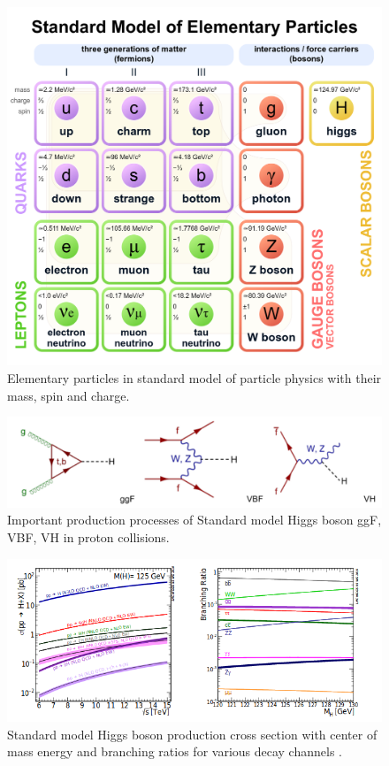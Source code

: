\documentclass[final,3p]{CSP}
\begin{document}
\clearpage
\begin{figure}[H]
	\centering
	\includegraphics[width= 0.5 \columnwidth]{./sm.png}
	\caption{Elementary particles in standard model of particle physics with their mass, spin and charge.}
	\label{figure 1}
\end{figure}

\begin{figure}[H]
	\centering
	\includegraphics[width=\columnwidth]{./production_mode.png}
	\caption{Important production processes of Standard model Higgs boson ggF, VBF, VH in proton collisions.}
	\label{figure 2}
\end{figure}


\begin{figure}[H]
  \centering
   \includegraphics[scale=0.7]{./cd2.png}
  \caption{Standard model Higgs boson production cross section with center of mass energy and branching ratios for various decay channels \cite{Tanabashi:2018oca}.}
   \label{figure 3}
\end{figure}
\end{document}

